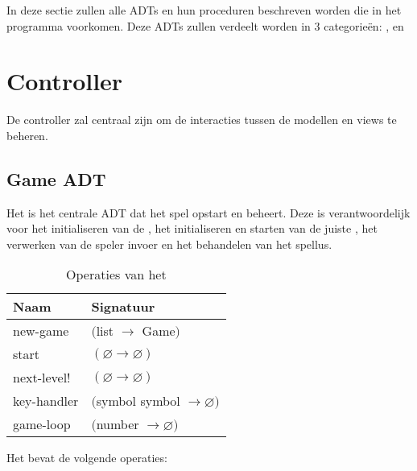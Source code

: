 In deze sectie zullen alle ADTs en hun proceduren beschreven worden 
die in het programma voorkomen.
Deze ADTs zullen verdeelt worden in 3 categorieën:
,
 en
\section{Controller}
\label{controller}
De controller zal centraal zijn om de interacties tussen de modellen en views te beheren. 

\subsection{Game ADT}
\label{section:game}
Het \texttt{} is het centrale ADT dat het spel opstart en beheert.
Deze is verantwoordelijk voor
het initialiseren van de \texttt{},
het initialiseren en starten van de juiste \texttt{},
het verwerken van de speler invoer
en het behandelen van het spellus.

\begin{table}[hbt]
\centering
\begin{tabular}{|ll|}
\hline
\rowcolor[HTML]{000000} 
{\color[HTML]{FFFFFF} \textbf{Naam}} & {\color[HTML]{FFFFFF} \textbf{Signatuur}} \\ \hline
new-game    & $($list $\rightarrow$ Game$)$                  \\ \hline
start       & $(\varnothing \rightarrow \varnothing)$        \\ \hline
next-level! & $(\varnothing \rightarrow \varnothing)$     	 \\ \hline
key-handler & $($symbol symbol $\rightarrow \varnothing)$    \\ \hline
game-loop   & $($number $\rightarrow \varnothing)$           \\ \hline
\end{tabular}
\caption{Operaties van het \texttt{}}
\label{table:1}
\end{table}

Het \texttt{} bevat de volgende operaties:


